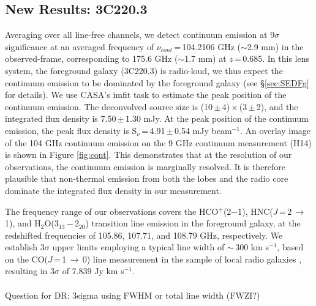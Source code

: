 \documentclass[twocolumn,apj,numberedappendix]{emulateapj}
\newcommand{\pmOne}{\mbox{$^{-1}$}}
\begin{document}
\subsection{New Results: 3C220.3} 
Averaging over all line-free channels, we detect continuum emission at 9$\sigma$ significance at an averaged frequency of $\nu_{cont}$\,=\,104.2106 GHz ($\sim$2.9 mm) in the observed-frame, corresponding to 175.6 GHz ($\sim$1.7 mm) at $z$\,=\,0.685. In this lens system, the 
foreground galaxy (3C220.3) is radio-loud, we thus expect the continuum emission to be dominated by the foreground galaxy (see \S \ref{sec:SEDFg} for details). We use CASA's {\sc imfit} task to estimate the peak position of the continuum emission. The deconvolved source size is (10\,$\pm$\,4)\,$\times$\,(3\,$\pm$\,2), and the integrated flux density is 7.50\,$\pm$\,1.30\,\,mJy. At the peak position of the continuum emission, the peak flux density is S$_\nu$\,=\,4.91\,$\pm$\,0.54\,\,mJy\,\,beam\pmOne. An overlay image of the 104 GHz continuum emission on the 9 GHz continuum measurement (H14) is shown in Figure \ref{fig:cont}. This demonstrates that at the resolution of our observations, the continuum emission is marginally resolved. It is therefore plausible that non-thermal emission from both the lobes and the radio core dominate the integrated flux density in our measurement.

The frequency range of our observations covers the HCO$^+$(2$-$1), HNC($J$\,=\,2\,$\rightarrow$\,1), and H$_2$O(3$_{13}$\,$-$\,2$_{20}$) 
transition line emission in the foreground galaxy, at 
the redshifted frequencies of 105.86, 107.71, and 108.79\,\,GHz, respectively. We establish 3$\sigma$ upper limits employing a typical line width of 
$\sim$\,300\,\,km\,\,s\pmOne, based on the CO($J$\,=\,1\,$\rightarrow$\,0) line measurement in the sample of local radio galaxies \citep[$z$ $<$ 0.1; ][]{Smolcic11a}, resulting in 3$\sigma$ of 7.839\,\,Jy\,\,km\,\,s\pmOne.\\ \\
Question for DR: 3sigma using FWHM or total line width (FWZI?) 
\end{document}
